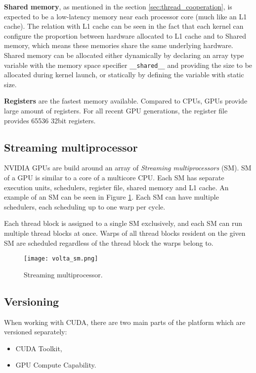 \textbf{Shared memory}, as mentioned in the section \ref{sec:thread_cooperation}, is expected to be a low-latency memory near each processor core (much like an L1 cache). The relation with L1 cache can be seen in the fact that each kernel can configure the proportion between hardware allocated to L1 cache and to Shared memory, which means these memories share the same underlying hardware. Shared memory can be allocated either dynamically by declaring an array type variable with the memory space specifier \texttt{\_\_shared\_\_} and providing the size to be allocated during kernel launch, or statically by defining the variable with static size.


\textbf{Registers} are the fastest memory available. Compared to CPUs, GPUs provide large amount of registers. For all recent GPU generations, the register file provides 65536 32bit registers. %

\subsection{Streaming multiprocessor}
\label{sec:sm}
NVIDIA GPUs are build around an array of \textit{Streaming multiprocessors} (SM). SM of a GPU is similar to a core of a multicore CPU. Each SM has separate execution units, schedulers, register file, shared memory and L1 cache. An example of an SM can be seen in Figure \ref{fig:volta_sm}. Each SM can have multiple schedulers, each scheduling up to one warp per cycle. 

Each thread block is assigned to a single SM exclusively, and each SM can run multiple thread blocks at once. Warps of all thread blocks resident on the given SM are scheduled regardless of the thread block the warps belong to.


\begin{figure}[h]
	\centering
	\texttt{[image: volta\_sm.png]}
	\caption{Streaming multiprocessor.}
	\label{fig:volta_sm}
\end{figure}

\subsection{Versioning}

When working with CUDA, there are two main parts of the platform which are versioned separately: %
\begin{itemize}
	\item CUDA Toolkit,
	\item GPU Compute Capability.
\end{itemize}

